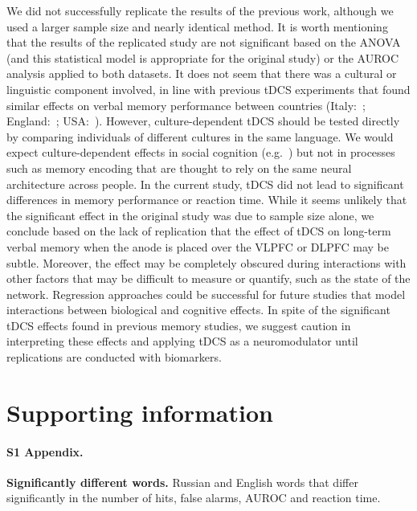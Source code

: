 \documentclass[10pt,letterpaper]{article}
\begin{document}
We did not successfully replicate the results of the previous work, although we used a larger sample size and nearly identical method. It is worth mentioning that the results of the replicated study are not significant based on the ANOVA (and this statistical model is appropriate for the original study) or the AUROC analysis applied to both datasets. It does not seem that there was a cultural or linguistic component involved, in line with previous tDCS experiments that found similar effects on verbal memory performance between countries (Italy:~\cite{pisoni2015guess}; England:~\cite{medvedeva2019effects}; USA:~\cite{matzen2015effects}). However, culture-dependent tDCS should be tested directly by comparing individuals of different cultures in the same language. We would expect culture-dependent effects in social cognition (e.g.~\cite{meinzer2014transcranial}) but not in processes such as memory encoding that are thought to rely on the same neural architecture across people. In the current study, tDCS did not lead to significant differences in memory performance or reaction time. While it seems unlikely that the significant effect in the original study was due to sample size alone, we conclude based on the lack of replication that the effect of tDCS on long-term verbal memory when the anode is placed over the VLPFC or DLPFC may be subtle. Moreover, the effect may be completely obscured during interactions with other factors that may be difficult to measure or quantify, such as the state of the network. Regression approaches could be successful for future studies that model interactions between biological and cognitive effects. In spite of the significant tDCS effects found in previous memory studies, we suggest caution in interpreting these effects and applying tDCS as a neuromodulator until replications are conducted with biomarkers.




\section*{Supporting information}

\paragraph*{S1 Appendix.}
\label{S1_Appendix}
{\bf Significantly different words.} Russian and English words that differ significantly in the number of hits, false alarms, AUROC and reaction time.
\end{document}
